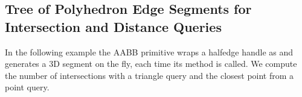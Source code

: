 \subsection{Tree of Polyhedron Edge Segments for Intersection and Distance Queries}
In the following example the AABB primitive wraps a halfedge handle as  and generates a 3D segment on the fly, each time its method  is called. We compute the number of intersections with a triangle query and the closest point from a point query. 
